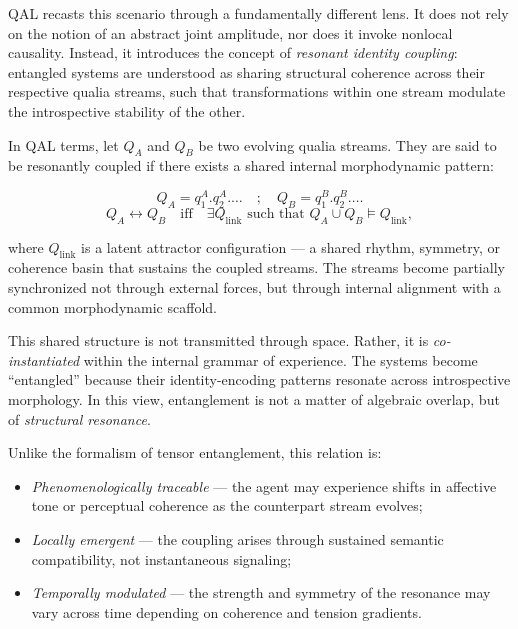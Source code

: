 \documentclass[11pt]{article}
\numberwithin{equation}{section} %
\begin{document}
QAL recasts this scenario through a fundamentally different lens. It does not rely on the notion of an abstract joint amplitude, nor does it invoke nonlocal causality. Instead, it introduces the concept of \textit{resonant identity coupling}: entangled systems are understood as sharing structural coherence across their respective qualia streams, such that transformations within one stream modulate the introspective stability of the other.

In QAL terms, let \( Q_A \) and \( Q_B \) be two evolving qualia streams. They are said to be resonantly coupled if there exists a shared internal morphodynamic pattern:

\begin{equation}
Q_A = q_1^A . q_2^A . \dots \quad ; \quad Q_B = q_1^B . q_2^B . \dots
\end{equation}
\begin{equation}
Q_A \leftrightarrow Q_B \quad \text{iff} \quad \exists Q_{\text{link}} \text{ such that } Q_A \cup Q_B \models Q_{\text{link}},
\end{equation}

\noindent where \( Q_{\text{link}} \) is a latent attractor configuration — a shared rhythm, symmetry, or coherence basin that sustains the coupled streams. The streams become partially synchronized not through external forces, but through internal alignment with a common morphodynamic scaffold.

This shared structure is not transmitted through space. Rather, it is \textit{co-instantiated} within the internal grammar of experience. The systems become “entangled” because their identity-encoding patterns resonate across introspective morphology. In this view, entanglement is not a matter of algebraic overlap, but of \textit{structural resonance}.

Unlike the formalism of tensor entanglement, this relation is:
\begin{itemize}
  \item \textit{Phenomenologically traceable} — the agent may experience shifts in affective tone or perceptual coherence as the counterpart stream evolves;
  \item \textit{Locally emergent} — the coupling arises through sustained semantic compatibility, not instantaneous signaling;
  \item \textit{Temporally modulated} — the strength and symmetry of the resonance may vary across time depending on coherence and tension gradients.
\end{itemize}
\end{document}
